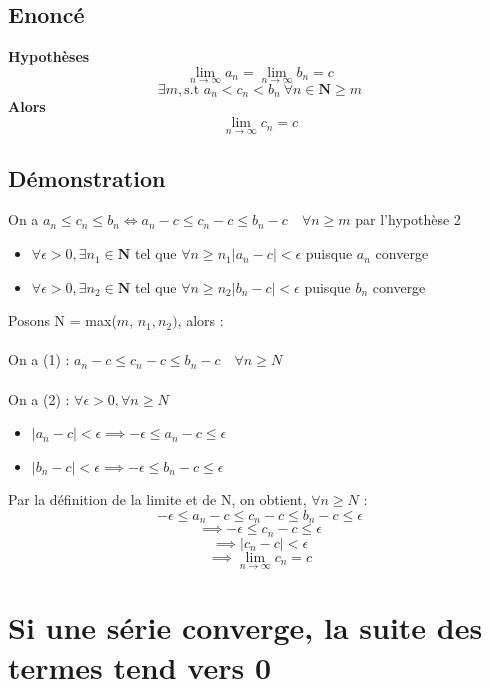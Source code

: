 \documentclass{article}
\begin{document}
\subsection{Enoncé}

\textbf{Hypothèses} \\
\[ \lim_{n\to\infty}a_n = \lim_{n\to\infty}b_n = c \]
\[ \exists m, \text{s.t } a_n < c_n < b_n\ \forall n \in \mathbf{N} \geq m \]
\textbf{Alors} \\
\[ \lim_{n\to\infty}c_n = c \]

\subsection{Démonstration}

On a $a_n \leq c_n \leq b_n \Leftrightarrow a_n - c \leq c_n - c \leq b_n - c \quad \forall n \geq m$ par l'hypothèse 2 \\
\begin{itemize}
    \item $\forall \epsilon > 0,\exists n_1 \in \mathbf{N}$ tel que $\forall n\geq n_1 \lvert a_n - c \lvert < \epsilon$ puisque $a_n$ converge
    \item $\forall \epsilon > 0,\exists n_2 \in \mathbf{N}$ tel que $\forall n\geq n_2 \lvert b_n - c \lvert < \epsilon$ puisque $b_n$ converge
\end{itemize}
Posons N = max($m$, $n_1, n_2)$, alors : \\\\
On a (1) : $a_n - c \leq c_n - c \leq b_n - c \quad \forall n \geq N$\\\\
On a (2) : $\forall \epsilon > 0, \forall n\geq N$
\begin{itemize}
    \item $ \lvert a_n - c \lvert < \epsilon \implies -\epsilon \leq a_n - c \leq \epsilon$
    \item $ \lvert b_n - c \lvert < \epsilon \implies -\epsilon \leq b_n - c \leq \epsilon$
\end{itemize}
Par la définition de la limite et de N, on obtient, $\forall n\geq N$ :
\[ -\epsilon \leq a_n - c \leq c_n - c \leq b_n - c \leq \epsilon  \]
\[ \implies -\epsilon\leq c_n - c \leq \epsilon \]
\[ \implies \lvert c_n - c \lvert < \epsilon \]
\[ \implies \lim_{n\to\infty}c_n = c \]

\newpage

\section{Si une série converge, la suite des termes tend vers 0}
\end{document}
